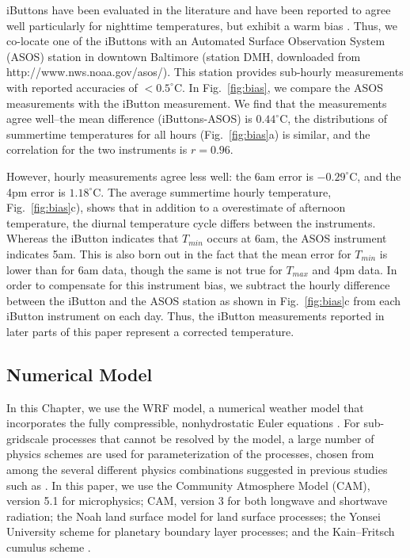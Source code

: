 iButtons have been evaluated in the literature and have been reported to agree well particularly for nighttime temperatures, but exhibit a warm bias \citep{scott2017temperature,terando2017ad}. Thus, we co-locate one of the iButtons with an Automated Surface Observation System (ASOS) station in downtown Baltimore (station DMH, downloaded from http://www.nws.noaa.gov/asos/). This station provides sub-hourly measurements with reported accuracies of $< 0.5^\circ $C. In Fig.~\ref{fig:bias}, we compare the ASOS measurements with the iButton measurement. We find that the measurements agree well--the mean difference (iButtons-ASOS) is $0.44^\circ$C, the distributions of summertime temperatures for all hours (Fig.~\ref{fig:bias}a) is similar, and the correlation for the two instruments is $r = 0.96$. 

However, hourly measurements agree less well: the 6am error is $-0.29^\circ$C, and the 4pm error is $1.18^\circ$C. The average summertime hourly temperature, Fig.~\ref{fig:bias}c), shows that in addition to a overestimate of afternoon temperature, the diurnal temperature cycle differs between the instruments. Whereas the iButton indicates that $T_{min}$ occurs at 6am, the ASOS instrument indicates 5am. This is also born out in the fact that the mean error for $T_{min}$ is lower than for 6am data, though the same is not true for $T_{max}$ and 4pm data. In order to compensate for this instrument bias, we subtract the hourly difference between the iButton and the ASOS station as shown in Fig.~\ref{fig:bias}c from each iButton instrument on each day. Thus, the iButton measurements reported in later parts of this paper represent a corrected temperature.  

\subsection{Numerical Model} 
\label{sec:methods_model}
In this Chapter, we use the WRF model, a numerical weather model that incorporates the fully
compressible, nonhydrostatic Euler equations \cite{skamarock2008description}. %
For sub-gridscale processes that cannot be resolved by the model, a large number of physics schemes are 
used for parameterization of the processes, chosen from among the
several different physics combinations suggested in
previous studies such as \cite{argueso2011evaluation, giannakopoulou2012persian, efstathiou2013sensitivity, zittis2014comparison}. %
In this paper, we use the
Community Atmosphere Model (CAM), version 5.1 \citep{neale2010description} %
for microphysics; CAM, version 3 \citep{collins2004description} %
for both longwave and shortwave radiation;
the Noah land surface model \citep{ek2003implementation} %
for land surface processes; 
the Yonsei University scheme \citep{hong2006new} %
for planetary boundary layer processes;
and the Kain–Fritsch cumulus scheme \citep{kain1990one}. %

